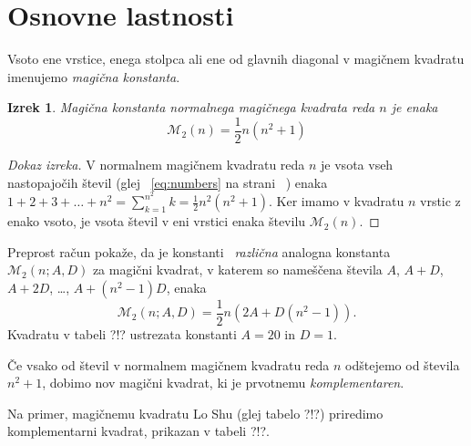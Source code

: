\documentclass[a4paper,12pt]{article}
\newcommand{\m}{\mathcal{M}_2}
\newenvironment{dokaz}{
 \begin{proof}[Dokaz izreka]
}
{
 \end{proof}
}
\theoremstyle{plain}
\newtheorem{izrek}{Izrek}
\theoremstyle{definition}
\newtheorem{definicija}{Definicija}
\begin{document}

\section{Osnovne lastnosti}

      Vsoto ene vrstice, enega stolpca ali ene od glavnih diagonal
      v magičnem kvadratu imenujemo \emph{magična konstanta}.

\begin{izrek}
   Magična konstanta normalnega magičnega kvadrata reda $n$
   je enaka
   \begin{equation}
      \m(n) = \frac{1}{2} n(n^2+1)
   \end{equation}
\end{izrek}


\begin{dokaz}
   V normalnem magičnem kvadratu reda $n$ je vsota vseh nastopajočih
   števil (glej ~\ref{eq:numbers} na strani ~\pageref{eq;numbers}) enaka
   $1+2+3+\dots+n^2=\sum_{k=1}^{n^2}k=\frac{1}{2}n^2(n^2+1)$. Ker imamo
   v kvadratu $n$ vrstic z enako vsoto, je vsota števil v eni vrstici
   enaka številu $\m(n)$. %
\end{dokaz}

Preprost račun pokaže, da je konstanti ~\emph{različna} analogna konstanta
$\m(n;A,D)$ za magični kvadrat, v katerem so nameščena števila
$A$, $A+D$, $A+2D$, \dots, $A+(n^2-1)D$, enaka %
\begin{equation}
   \label{eq:mc}
   \m(n; A, D) = \frac{1}{2} n \left(2A + D(n^2-1) \right).
\end{equation}
Kvadratu v tabeli ?!? ustrezata konstanti $A=20$ in $D=1$.

      Če vsako od števil v normalnem magičnem kvadratu reda $n$ odštejemo
      od števila $n^2+1$, dobimo nov magični kvadrat, ki je prvotnemu
      \emph{komplementaren}.

Na primer, magičnemu kvadratu Lo Shu (glej tabelo ?!?) priredimo
komplementarni kvadrat, prikazan v tabeli ?!?.
%
\end{document}

